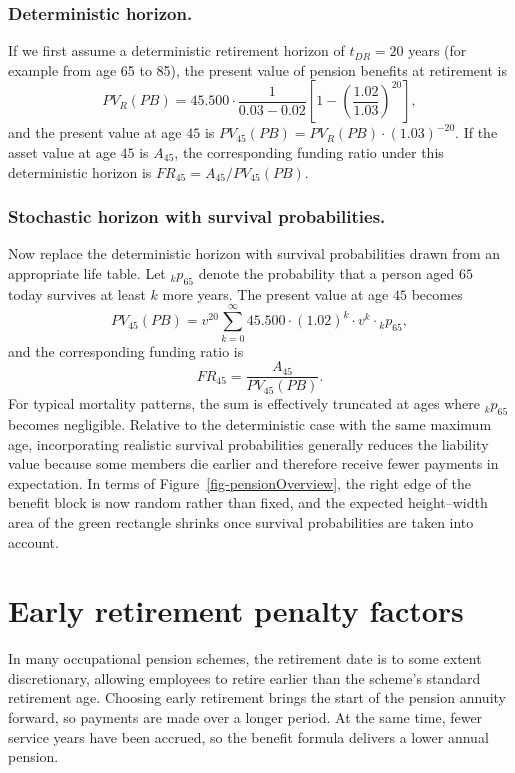 \documentclass[
  letterpaper,
  DIV=11,
  numbers=noendperiod]{scrreprt}
\begin{document}
\subsubsection{Deterministic horizon.}\label{deterministic-horizon.}

If we first assume a deterministic retirement horizon of \(t_{DR} = 20\)
years (for example from age 65 to 85), the present value of pension
benefits at retirement is \[
    PV_{R}(PB) = 45{.}500 \cdot \frac{1}{0.03 - 0.02} \left[ 1 - \left(\frac{1.02}{1.03}\right)^{20} \right],
\] and the present value at age \(45\) is
\(PV_{45}(PB) = PV_R(PB) \cdot (1.03)^{-20}\). If the asset value at age
\(45\) is \(A_{45}\), the corresponding funding ratio under this
deterministic horizon is \(FR_{45} = A_{45} / PV_{45}(PB)\).

\subsubsection{Stochastic horizon with survival
probabilities.}\label{stochastic-horizon-with-survival-probabilities.}

Now replace the deterministic horizon with survival probabilities drawn
from an appropriate life table. Let \({}_k p_{65}\) denote the
probability that a person aged \(65\) today survives at least \(k\) more
years. The present value at age \(45\) becomes \[
    PV_{45}(PB)  = v^{20} \sum_{k=0}^{\infty} 45{.}500 \cdot (1.02)^{k} \cdot v^{k} \cdot {}_kp_{65},
\] and the corresponding funding ratio is \[
    FR_{45} = \frac{A_{45}}{PV_{45}(PB)}.
\] For typical mortality patterns, the sum is effectively truncated at
ages where \({}_k p_{65}\) becomes negligible. Relative to the
deterministic case with the same maximum age, incorporating realistic
survival probabilities generally reduces the liability value because
some members die earlier and therefore receive fewer payments in
expectation. In terms of Figure~\ref{fig-pensionOverview}, the right
edge of the benefit block is now random rather than fixed, and the
expected height--width area of the green rectangle shrinks once survival
probabilities are taken into account.

\section{Early retirement penalty factors}\label{sec:penaltyFactors}

In many occupational pension schemes, the retirement date is to some
extent discretionary, allowing employees to retire earlier than the
scheme's standard retirement age. Choosing early retirement brings the
start of the pension annuity forward, so payments are made over a longer
period. At the same time, fewer service years have been accrued, so the
benefit formula delivers a lower annual pension.
\end{document}
